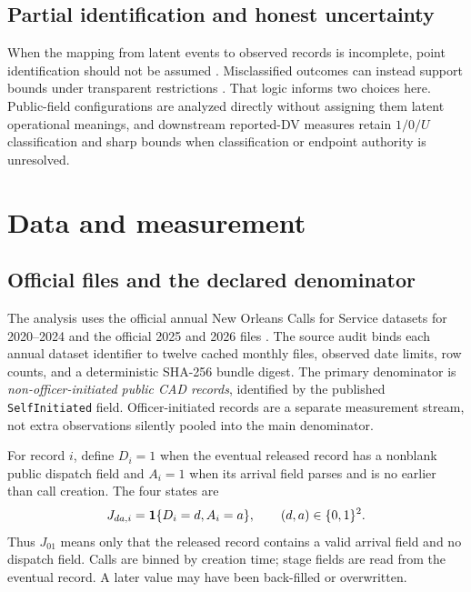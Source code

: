 \documentclass[11pt]{article}
\begin{document}
\subsection{Partial identification and honest uncertainty}

When the mapping from latent events to observed records is incomplete, point identification should not be assumed \citep{Manski1989,Manski1990,Manski2003,Tamer2010,Molinari2020}. Misclassified outcomes can instead support bounds under transparent restrictions \citep{HorowitzManski1995,Molinari2008}. That logic informs two choices here. Public-field configurations are analyzed directly without assigning them latent operational meanings, and downstream reported-DV measures retain $1/0/U$ classification and sharp bounds when classification or endpoint authority is unresolved.

\section{Data and measurement}

\subsection{Official files and the declared denominator}

The analysis uses the official annual New Orleans Calls for Service datasets for 2020--2024 and the official 2025 and 2026 files \citep{DataNOLA2021,DataNOLA2025,DataNOLA2026}. The source audit binds each annual dataset identifier to twelve cached monthly files, observed date limits, row counts, and a deterministic SHA-256 bundle digest. The primary denominator is \emph{non-officer-initiated public CAD records}, identified by the published \texttt{SelfInitiated} field. Officer-initiated records are a separate measurement stream, not extra observations silently pooled into the main denominator.

For record $i$, define $D_i=1$ when the eventual released record has a nonblank public dispatch field and $A_i=1$ when its arrival field parses and is no earlier than call creation. The four states are
\begin{equation}
J_{da,i}=\mathbf{1}\{D_i=d,A_i=a\},\qquad (d,a)\in\{0,1\}^2.
\end{equation}
Thus $J_{01}$ means only that the released record contains a valid arrival field and no dispatch field. Calls are binned by creation time; stage fields are read from the eventual record. A later value may have been back-filled or overwritten.
\end{document}
